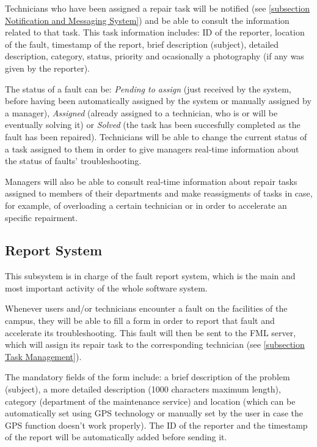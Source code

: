 Technicians who have been assigned a repair task will be notified (see \ref{subsection Notification and Messaging System}) and be able to consult the information related to that task. This task information includes: ID of the reporter, location of the fault, timestamp of the report, brief description (subject), detailed description, category, status, priority and ocasionally a photography (if any was given by the reporter). 

The status of a fault can be: \emph{Pending to assign} (just received by the system, before having been automatically assigned by the system or manually assigned by a manager), \emph{Assigned} (already assigned to a technician, who is or will be eventually solving it) or \emph{Solved} (the task has been succesfully completed as the fault has been repaired). Technicians will be able to change the current status of a task assigned to them in order to give managers real-time information about the status of faults' troubleshooting.

Managers will also be able to consult real-time information about repair tasks assigned to members of their departments and make reassigments of tasks in case, for example, of overloading a certain technician or in order to accelerate an specific repairment.

\subsection{Report System}
\label{subsection Report System}

This subsystem is in charge of the fault report system, which is the main and most important activity of the whole software system.

Whenever users and/or technicians encounter a fault on the facilities of the campus, they will be able to fill a form in order to report that fault and accelerate its troubleshooting. This fault will then be sent to the FML server, which will assign its repair task to the corresponding technician (see \ref{subsection Task Management}).

The mandatory fields of the form include: a brief description of the problem (subject), a more detailed description (1000 characters maximum length), category (department of the maintenance service) and location (which can be automatically set using GPS technology or manually set by the user in case the GPS function doesn't work properly). The ID of the reporter and the timestamp of the report will be automatically added before sending it. 

